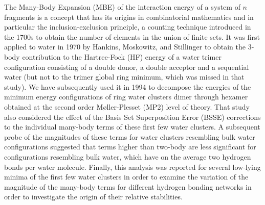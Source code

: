 \documentclass[11pt, proquest]{uwthesis}[2020/02/24]
\begin{document}
\par The Many-Body Expansion (MBE) of the interaction energy of a system of $n$ fragments is a concept that has its origins in combinatorial mathematics and in particular the inclusion-exclusion principle, a counting technique introduced in the 1700s to obtain the number of elements in the union of finite sets.\autocite{roberts_applied_2009} It was first applied to water in 1970 by Hankins, Moskowitz, and Stillinger\autocite{hankins_water_1970} to obtain the 3-body contribution to the Hartree-Fock (HF) energy of a water trimer configuration consisting of a double donor, a double acceptor and a sequential water (but not to the trimer global ring minimum, which was missed in that study). We have subsequently used it in 1994 to decompose the energies of the minimum energy configurations of ring water clusters dimer through hexamer obtained at the second order Møller-Plesset (MP2) level of theory.\autocite{xantheas_ab_1994} That study also considered the effect of the Basis Set Superposition Error (BSSE) corrections\autocite{boys_calculation_1970, xantheas_importance_1996} to the individual many-body terms of these first few water clusters. A subsequent probe of the magnitudes of these terms for water clusters resembling bulk water configurations suggested that terms higher than two-body are less significant for configurations resembling bulk water, which have on the average two hydrogen bonds per water molecule.\autocite{xantheas_significance_1996} Finally, this analysis was reported for several low-lying minima of the first few water clusters in order to examine the variation of the magnitude of the many-body terms for different hydrogen bonding networks in order to investigate the origin of their relative stabilities.\autocite{xantheas_cooperativity_2000}
\end{document}
